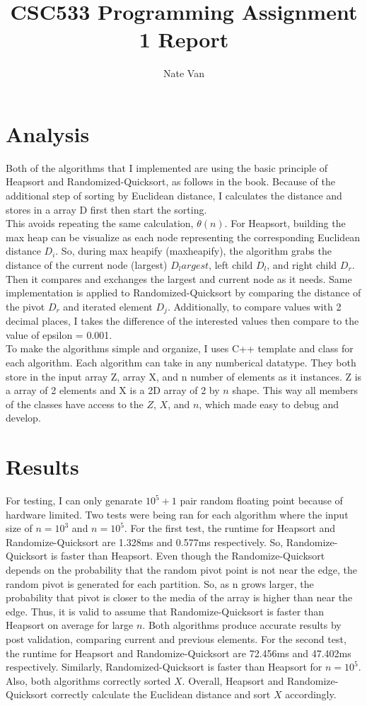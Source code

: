 \documentclass[11pt]{article}
\title{CSC533 Programming Assignment 1 Report}
\author{Nate Van}
\date{}
\begin{document}
\maketitle
\pagebreak
\section{Analysis}
Both of the algorithms that I implemented are using the basic principle of Heapsort and Randomized-Quicksort, as follows in the book.
Because of the additional step of sorting by Euclidean distance, I calculates the distance and stores in a array D first then start the sorting. \\
This avoids repeating the same calculation, $\theta(n)$.
For Heapsort, building the max heap can be visualize as each node representing the corresponding Euclidean distance $D_i$.
So, during max heapify (max\textunderscore heapify), the algorithm grabs the distance of the current node (largest) $D_largest$, left child $D_l$, and right child $D_r$.
Then it compares and exchanges the largest and current node as it needs.
Same implementation is applied to Randomized-Quicksort by comparing the distance of the pivot $D_r$ and iterated element $D_j$.
Additionally, to compare values with 2 decimal places, I takes the difference of the interested values then compare to the value of epsilon = 0.001. \\
To make the algorithms simple and organize, I uses C++ template and class for each algorithm.
Each algorithm can take in any numberical datatype.
They both store in the input array Z, array X, and n number of elements as it instances.
Z is a array of 2 elements and X is a 2D array of 2 by $n$ shape.
This way all members of the classes have access to the $Z$, $X$, and $n$, which made easy to debug and develop. \\
\section{Results}
For testing, I can only genarate $10^5 + 1$ pair random floating point because of hardware limited.
Two tests were being ran for each algorithm where the input size of $n=10^3$ and $n=10^5$.
For the first test, the runtime for Heapsort and Randomize-Quicksort are 1.328ms and 0.577ms respectively.
So, Randomize-Quicksort is faster than Heapsort.
Even though the Randomize-Quicksort depends on the probability that the random pivot point is not near the edge, the random pivot is generated for each partition.
So, as n grows larger, the probability that pivot is closer to the media of the array is higher than near the edge.
Thus, it is valid to assume that Randomize-Quicksort is faster than Heapsort on average for large $n$.
Both algorithms produce accurate results by post validation, comparing current and previous elements.
For the second test, the runtime for Heapsort and Randomize-Quicksort are 72.456ms and 47.402ms respectively.
Similarly, Randomized-Quicksort is faster than Heapsort for $n=10^5$.
Also, both algorithms correctly sorted $X$.
Overall, Heapsort and Randomize-Quicksort correctly calculate the Euclidean distance and sort $X$ accordingly.
\end{document}
